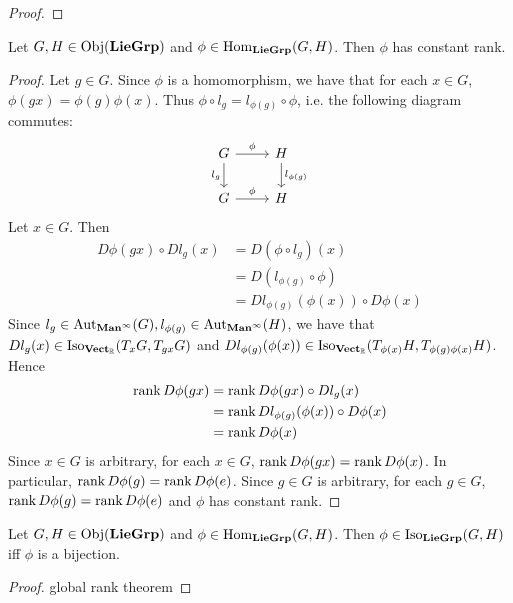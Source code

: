 \documentclass{book}
\begin{document}
\begin{proof}
\end{proof}

\begin{ex}
	Let $G, H \in \operatorname{Obj}(\operatorname*{\text{\textbf{LieGrp}}})$ and $\phi \in \operatorname{Hom}_{\operatorname*{\text{\textbf{LieGrp}}}}(G, H)$. Then $\phi$ has constant rank. 
\end{ex}

\begin{proof}
	Let $g \in G$. Since $\phi$ is a homomorphism, we have that for each $x \in G$, $\phi(g x) = \phi(g) \phi(x)$. Thus $\phi \circ l_g = l_{\phi(g)} \circ \phi$, i.e. the following diagram commutes: 
	\[ 
	\begin{tikzcd}
		G \arrow[r, "\phi"] \arrow[d, "l_g"'] & H \arrow[d, "l_{\phi(g)}"]  \\
		G \arrow[r, "\phi"]                   & H
	\end{tikzcd}
	\]
	Let $x \in G$. Then
	\begin{align*}
		D\phi(gx) \circ D l_g (x) 
		& = D(\phi \circ l_g) (x) \\
		& = D(l_{\phi(g)} \circ \phi) \\
		& = D l_{\phi(g)} (\phi(x)) \circ D \phi (x) 
	\end{align*}
	Since $l_g \in \operatorname{Aut}_{\operatorname*{\text{\textbf{Man}}^{\infty}}}(G), l_{\phi(g)} \in \operatorname{Aut}_{\operatorname*{\text{\textbf{Man}}^{\infty}}}(H)$, we have that $D l_g (x) \in \operatorname{Iso}_{\operatorname*{\text{\textbf{Vect}}_{\mathbb{R}}}}(T_x G, T_{g x} G)$ and $D l_{\phi(g)}(\phi(x)) \in \operatorname{Iso}_{\operatorname*{\text{\textbf{Vect}}_{\mathbb{R}}}}(T_{\phi(x)}H, T_{\phi(g) \phi(x)}H)$. Hence 
	\begin{align*}
		\operatorname{\text{rank}} D\phi(gx)
		& = \operatorname{\text{rank}} D\phi(gx) \circ D l_g (x) \\
		& = \operatorname{\text{rank}} D l_{\phi(g)} (\phi(x)) \circ D \phi (x) \\
		& = \operatorname{\text{rank}}  D \phi (x)
	\end{align*} 
	Since $x \in G$ is arbitrary, for each $x \in G$, $\operatorname{\text{rank}} D\phi(gx) = \operatorname{\text{rank}}  D \phi (x)$. In particular, $\operatorname{\text{rank}} D\phi(g) = \operatorname{\text{rank}}  D \phi (e)$. Since $g \in G$ is arbitrary, for each $g \in G$, $\operatorname{\text{rank}} D\phi(g) = \operatorname{\text{rank}}  D \phi (e)$ and $\phi$ has constant rank. 
\end{proof}


\begin{ex}
	Let $G, H \in \operatorname{Obj}(\operatorname*{\text{\textbf{LieGrp}}})$ and $\phi \in \operatorname{Hom}_{\operatorname*{\text{\textbf{LieGrp}}}}(G, H)$. Then $\phi \in \operatorname{Iso}_{\operatorname*{\text{\textbf{LieGrp}}}}(G, H)$ iff $\phi$ is a bijection.
\end{ex}

\begin{proof}
	global rank theorem 
\end{proof}
\end{document}
